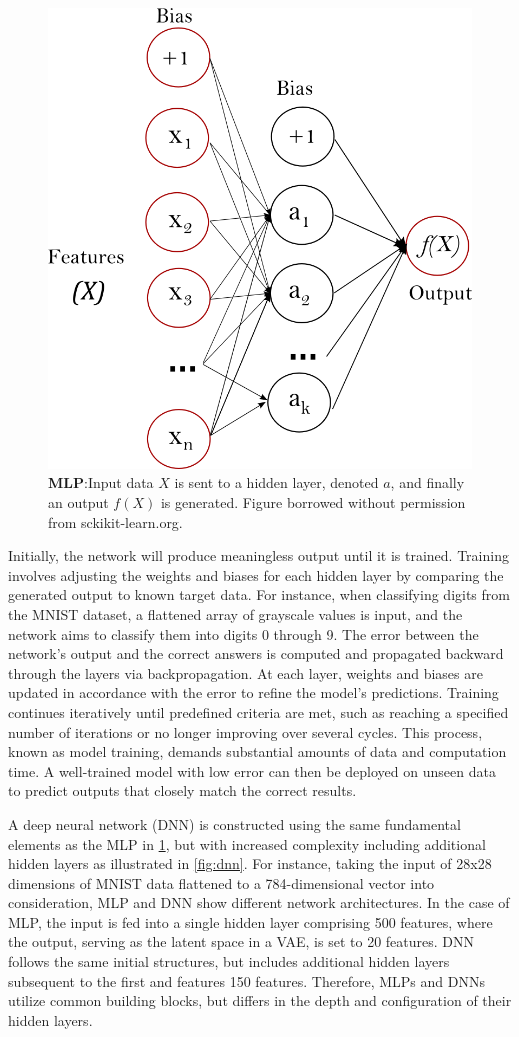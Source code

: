 \begin{figure}[H]
    \centering
    \includegraphics[width=0.5\linewidth]{latex//figures/multilayerperceptron_network.png}
    \caption{\textbf{MLP}:Input data $X$ is sent to a hidden layer, denoted $a$, and finally an output $f(X)$ is generated. Figure borrowed without permission from sckikit-learn.org.}
    \label{fig:mlp}
\end{figure}

Initially, the network will produce meaningless output until it is trained. Training involves adjusting the weights and biases for each hidden layer by comparing the generated output to known target data. For instance, when classifying digits from the MNIST dataset, a flattened array of grayscale values is input, and the network aims to classify them into digits 0 through 9. The error between the network's output and the correct answers is computed and propagated backward through the layers via backpropagation. At each layer, weights and biases are updated in accordance with the error to refine the model's predictions. Training continues iteratively until predefined criteria are met, such as reaching a specified number of iterations or no longer improving over several cycles. This process, known as model training, demands substantial amounts of data and computation time. A well-trained model with low error can then be deployed on unseen data to predict outputs that closely match the correct results.

A deep neural network (DNN) is constructed using the same fundamental elements as the MLP in \ref{fig:mlp}, but with increased complexity including additional hidden layers as illustrated in \ref{fig:dnn}. For instance, taking the input of 28x28 dimensions of MNIST data flattened to a 784-dimensional vector into consideration, MLP and DNN show different network architectures. In the case of MLP, the input is fed into a single hidden layer comprising 500 features, where the output, serving as the latent space in a VAE, is set to 20 features. DNN follows the same initial structures, but includes additional hidden layers subsequent to the first and features 150 features. Therefore, MLPs and DNNs utilize common building blocks, but differs in the depth and configuration of their hidden layers.

